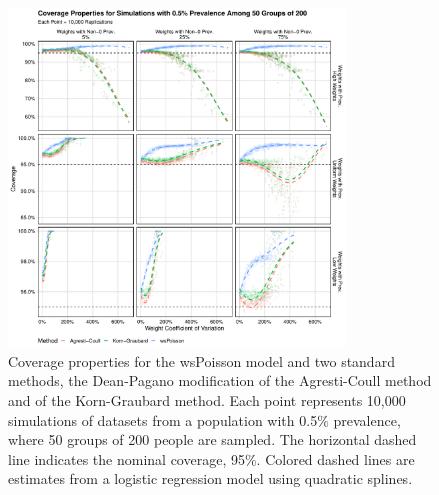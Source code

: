 \begin{figure}
\centering
\includegraphics[width=0.8\textwidth]{perfect_coverage_50_groups_0_005_prev}
\caption{Coverage properties for the wsPoisson model and two standard methods, the Dean-Pagano modification of the Agresti-Coull method and of the Korn-Graubard method.
Each point represents 10,000 simulations of datasets from a population with 0.5\% prevalence, where 50 groups of 200 people are sampled.
The horizontal dashed line indicates the nominal coverage, 95\%.
Colored dashed lines are estimates from a logistic regression model using quadratic splines.}
\label{ch_3:fig:perfect_coverage_50_groups_0_005_prev}
\end{figure}

